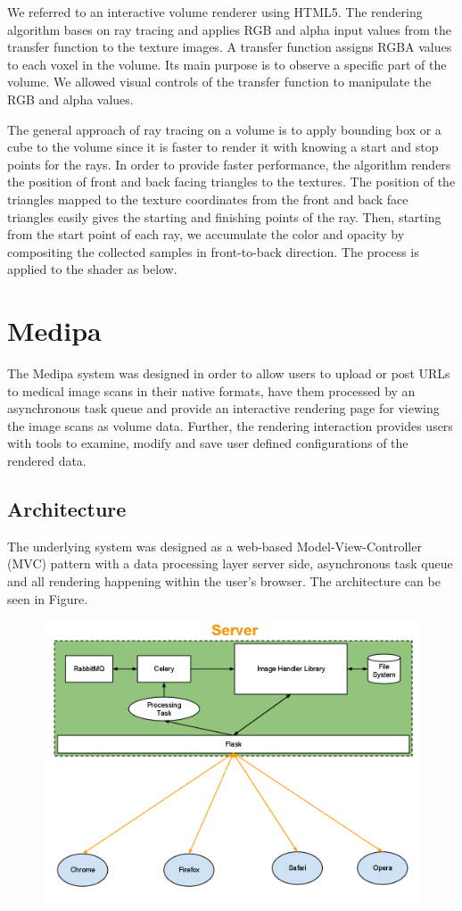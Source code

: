 \documentclass{acm_proc_article-sp}
\begin{document}
We referred to an interactive volume renderer using HTML5. The rendering algorithm bases on ray tracing and applies RGB and alpha input values from the transfer function to the texture images. A transfer function assigns RGBA values to each voxel in the volume. Its main purpose is to observe a specific part of the volume. We allowed visual controls of the transfer function to manipulate the RGB and alpha values. 

The general approach of ray tracing on a volume is to apply bounding box or a cube to the volume since it is faster to render it with knowing a start and stop points for the rays. In order to provide faster performance, the algorithm renders the position of front and back facing triangles to the textures. The position of the triangles mapped to the texture coordinates from the front and back face triangles easily gives the starting and finishing points of the ray. Then, starting from the start point of each ray, we accumulate the color and opacity by compositing the collected samples in front-to-back direction. The process is applied to the shader as below.

\section{Medipa}
The Medipa system was designed in order to allow users to upload or post URLs to medical image scans in their native formats, have them processed by an asynchronous task queue and provide an interactive rendering page for viewing the image scans as volume data.  Further, the rendering interaction provides users with tools to examine, modify and save user defined configurations of the rendered data.

\subsection{Architecture}
The underlying system was designed as a web-based Model-View-Controller (MVC) pattern with a data processing layer server side, asynchronous task queue and all rendering happening within the user's browser.  The architecture can be seen in Figure.

\begin{figure}[htb]
\includegraphics[scale=0.5]{architecture.png}
\end{figure}
\end{document}
